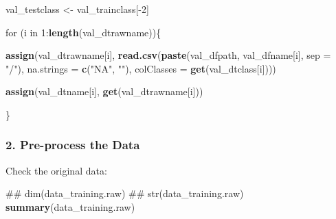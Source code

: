 \documentclass[]{article}
\newenvironment{Shaded}{\begin{snugshade}}{\end{snugshade}}
\newcommand{\KeywordTok}[1]{\textcolor[rgb]{0.13,0.29,0.53}{\textbf{{#1}}}}
\newcommand{\DataTypeTok}[1]{\textcolor[rgb]{0.13,0.29,0.53}{{#1}}}
\newcommand{\DecValTok}[1]{\textcolor[rgb]{0.00,0.00,0.81}{{#1}}}
\newcommand{\StringTok}[1]{\textcolor[rgb]{0.31,0.60,0.02}{{#1}}}
\newcommand{\NormalTok}[1]{{#1}}
\begin{document}
\begin{Shaded}
\begin{Highlighting}[]
\NormalTok{val_testclass <-}\StringTok{ }\NormalTok{val_trainclass[-}\DecValTok{2}\NormalTok{]}

\NormalTok{for (i in }\DecValTok{1}\NormalTok{:}\KeywordTok{length}\NormalTok{(val_dtrawname))\{}
  
  \KeywordTok{assign}\NormalTok{(val_dtrawname[i], }\KeywordTok{read.csv}\NormalTok{(}\KeywordTok{paste}\NormalTok{(val_dfpath, val_dfname[i], }\DataTypeTok{sep =} \StringTok{"/"}\NormalTok{), }
                                    \DataTypeTok{na.strings =} \KeywordTok{c}\NormalTok{(}\StringTok{"NA"}\NormalTok{, }\StringTok{""}\NormalTok{), }
                                    \DataTypeTok{colClasses =} \KeywordTok{get}\NormalTok{(val_dtclass[i])))}
  
  \KeywordTok{assign}\NormalTok{(val_dtname[i], }\KeywordTok{get}\NormalTok{(val_dtrawname[i]))}
  
\NormalTok{\}}
\end{Highlighting}
\end{Shaded}

\subsubsection{2. Pre-process the Data}\label{pre-process-the-data}

Check the original data:

\begin{Shaded}
\begin{Highlighting}[]
\NormalTok{## dim(data_training.raw)}
\NormalTok{## str(data_training.raw)}
\KeywordTok{summary}\NormalTok{(data_training.raw)}
\end{Highlighting}
\end{Shaded}
\end{document}
